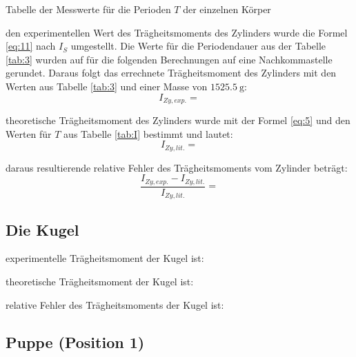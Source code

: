 \begin{table}[H]
    \centering
    
    \caption{Tabelle der Messwerte für die Perioden $T$ der einzelnen Körper}
    \label{tab:3}
\end{table}


\justifying den experimentellen Wert des Trägheitsmoments des Zylinders wurde die Formel \eqref{eq:11} nach $I_S$ umgestellt.
Die Werte für die Periodendauer aus der Tabelle \ref{tab:3} wurden auf für die folgenden Berechnungen auf eine Nachkommastelle gerundet.
Daraus folgt das errechnete Trägheitsmoment des Zylinders mit den Werten aus Tabelle \ref{tab:3} und einer Masse von $\SI{1525.5}{\gram}$:
\begin{equation}
I_{Zy, exp.} = \label{eq:18}
\end{equation}

\justifying theoretische Trägheitsmoment des Zylinders wurde mit der Formel \eqref{eq:5} und den Werten für $T$ aus Tabelle 
\ref{tab:I} bestimmt und lautet:
\begin{equation}
I_{Zy, lit.} = \label{eq:19}
\end{equation}

\justifying daraus resultierende relative Fehler des Trägheitsmoments vom Zylinder beträgt:
\begin{equation}
\frac{I_{Zy, exp.} - I_{Zy, lit.}}{I_{Zy, lit.}} = \label{eq:20}
\end{equation}
\newpage

\subsection{Die Kugel}\justifying %

\justifying experimentelle Trägheitsmoment der Kugel ist:


\justifying theoretische Trägheitsmoment der Kugel ist:


\justifying relative Fehler des Trägheitsmoments der Kugel ist:


\subsection{Puppe (Position 1)}\justifying %

